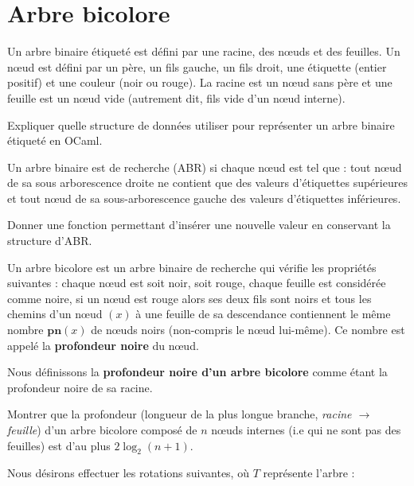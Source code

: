 \renewcommand{\SourceFile}{4-arborescences/src/4-2.ml}

\section{Arbre bicolore}

\Q
Un arbre binaire étiqueté est défini par une racine, des nœuds et des feuilles. Un nœud est défini par un père, un fils gauche, un fils droit, une étiquette (entier positif) et une couleur (noir ou rouge). La racine est un nœud sans père et une feuille est un nœud vide (autrement dit, fils vide d'un nœud interne).
\medskip

Expliquer quelle structure de données utiliser pour représenter un arbre binaire étiqueté en OCaml.

\Q
Un arbre binaire est de recherche (ABR) si chaque nœud est tel que : tout nœud de sa sous arborescence droite ne contient que des valeurs d'étiquettes supérieures et tout nœud de sa sous-arborescence gauche des valeurs d'étiquettes inférieures.
\medskip

Donner une fonction permettant d'insérer une nouvelle valeur en conservant la structure d'ABR.

\Q
Un arbre bicolore est un arbre binaire de recherche qui vérifie les propriétés suivantes : chaque nœud est soit noir, soit rouge, chaque feuille est considérée comme noire, si un nœud est rouge alors ses deux fils sont noirs et tous les chemins d'un nœud $(x)$ à une feuille de sa descendance contiennent le même nombre $\textbf{pn}(x)$ de nœuds noirs (non-compris le nœud lui-même). Ce nombre est appelé la \textbf{profondeur noire} du nœud.
\medskip

Nous définissons la \textbf{profondeur noire d'un arbre bicolore} comme étant la profondeur noire de sa racine.
\medskip

Montrer que la profondeur (longueur de la plus longue branche, \textit{racine $\rightarrow$ feuille}) d'un arbre bicolore composé de $n$ nœuds internes (i.e qui ne sont pas des feuilles) est d'au plus $2\log_2(n+1)$.

\Q
Nous désirons effectuer les rotations suivantes, où $T$ représente l'arbre :
\bigskip

\bigskip

